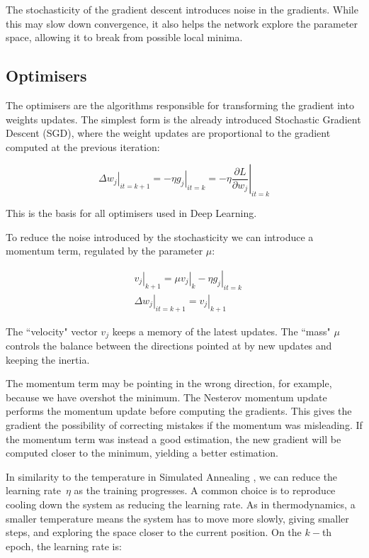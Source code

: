 The stochasticity of the gradient descent introduces noise in the gradients.
While this may slow down convergence, it also helps the network explore the parameter space, allowing it to break from possible local minima.

\subsection{Optimisers}
The optimisers are the algorithms responsible for transforming the gradient into weights updates.
The simplest form is the already introduced Stochastic Gradient Descent (SGD), 
where the weight updates are proportional to the gradient computed at the previous iteration:

\begin{equation*}
\left.\Delta w_j\right|_{it=k+1} = - \left.\eta g_j\right|_{it=k} = - \eta \left.\frac{\partial L}{\partial w_j}\right|_{it=k}
\end{equation*}

This is the basis for all optimisers used in Deep Learning.


To reduce the noise introduced by the stochasticity we can introduce a momentum term, regulated by the parameter $\mu$:

\begin{align*}
&\left.v_j\right|_{k+1} = \mu \left. v_j\right|_{k} - \left.\eta g_j\right|_{it=k}\\
&\left.\Delta w_j\right|_{it=k+1} = \left.v_j\right|_{k+1}
\end{align*}

The ``velocity" vector $v_j$ keeps a memory of the latest updates.
The ``mass" $\mu$ controls the balance between the directions pointed at by new updates and keeping the inertia.

The momentum term 
may be pointing in the wrong direction, for example, because we have overshot the minimum.
The Nesterov momentum update~\citep{nag} performs the momentum update before computing the gradients.
This gives the gradient the possibility of correcting mistakes if the momentum was misleading.
If the momentum term was instead a good estimation, the new gradient will be computed closer to the minimum, yielding a better estimation.

In similarity 
to the temperature in Simulated Annealing \citep{genSA}, we can reduce the learning rate~$\eta$ as the training progresses.
A common choice is to reproduce cooling down the system as reducing the learning rate.
As in thermodynamics, a smaller temperature means the system has to move more slowly, giving smaller steps, and exploring the space closer to the current position.
On the $k-$th epoch, the learning rate is:

